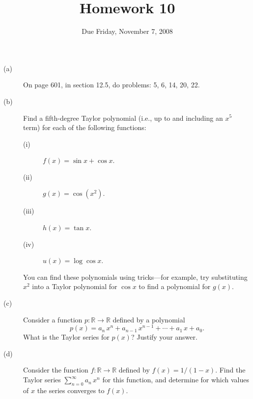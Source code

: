 \documentclass[12pt]{article}
\title{Homework 10}
\date{Due Friday, November 7, 2008}
\newcommand{\R}{\mathbb{R}}
\begin{document}
\maketitle

\begin{description}

\item[(a)] On page 601, in section 12.5, do problems: 5, 6, 14, 20, 22.

\vfill

\item[(b)] Find a fifth-degree Taylor polynomial (i.e., up to and
  including an $x^5$ term) for each of the following functions:
\begin{description}
\item[(i)] $f(x) = \sin x + \cos x$.
\item[(ii)] $g(x) = \cos \left(x^2\right)$.
\item[(iii)] $h(x) = \tan x$.
\item[(iv)] $u(x) = \log \cos x$.
\end{description}
You can find these polynomials using tricks---for example, try
substituting $x^2$ into a Taylor polynomial for $\cos x$ to find a
polynomial for $g(x)$.

\vfill

\item[(c)] Consider a function $p : \R \to \R$ defined by a polynomial
$$
p(x) = a_n \, x^n + a_{n-1} \, x^{n-1} + \cdots + a_1 \, x + a_0.
$$
What is the Taylor series for $p(x)$?  Justify your answer.

\vfill

\item[(d)] Consider the function $f : \R \to \R$ defined by $f(x) =
  1/(1 - x)$.  Find the Taylor series $\sum_{n=0}^\infty a_n\,x^n$ for
  this function, and determine for which values of $x$ the series
  converges to $f(x)$.

\vfill

\end{description}
\end{document}
